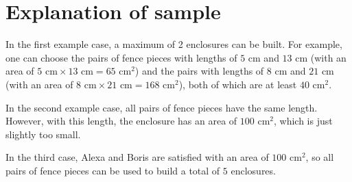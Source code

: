 \section*{Explanation of sample}
In the first example case, a maximum of 2 enclosures can be built.
For example, one can choose the pairs of fence pieces with lengths of $5$ cm and $13$ cm
(with an area of $5 \text{ cm} \times 13 \text{ cm} = 65 \text{ cm}^2$) and the pairs with
lengths of $8$ cm and $21$ cm (with an area of $8 \text{ cm} \times 21 \text{ cm} = 168 \text{ cm}^2$),
both of which are at least $40 \text{ cm}^2$.

In the second example case, all pairs of fence pieces have the same length.
However, with this length, the enclosure has an area of $100 \text{ cm}^2$, which is just slightly too small.

In the third case, Alexa and Boris are satisfied with an area of $100 \text{ cm}^2$, so all pairs of fence
pieces can be used to build a total of $5$ enclosures.
